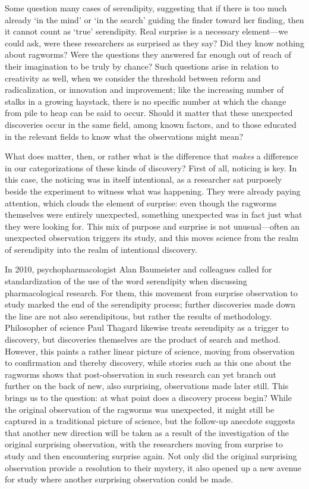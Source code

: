 \documentclass[authordate, empirical]{jote-new-article}
\begin{document}
	Some question many cases of serendipity, suggesting that if there is too much already ‘in the mind' or ‘in the search' guiding the finder toward her finding, then it cannot count as ‘true' serendipity. Real surprise is a necessary element—we could ask, were these researchers as surprised as they say? Did they know nothing about ragworms? Were the questions they answered far enough out of reach of their imagination to be truly by chance? Such questions arise in relation to creativity as well, when we consider the threshold between reform and radicalization, or innovation and improvement; like the increasing number of stalks in a growing haystack, there is no specific number at which the change from pile to heap can be said to occur. Should it matter that these unexpected discoveries occur in the same field, among known factors, and to those educated in the relevant fields to know what the observations might mean?



	What does matter, then, or rather what is the difference that \emph{makes} a difference in our categorizations of these kinds of discovery? First of all, noticing is key. In this case, the noticing was in itself intentional, as a researcher sat purposely beside the experiment to witness what was happening. They were already paying attention, which clouds the element of surprise: even though the ragworms themselves were entirely unexpected, something unexpected was in fact just what they were looking for. This mix of purpose and surprise is not unusual—often an unexpected observation triggers its study, and this moves science from the realm of serendipity into the realm of intentional discovery.



	In 2010, psychopharmacologist Alan Baumeister and colleagues called for standardization of the use of the word serendipity when discussing pharmacological research. For them, this movement from surprise observation to study marked the end of the serendipity process; further discoveries made down the line are not also serendipitous, but rather the results of methodology. Philosopher of science Paul Thagard likewise treats serendipity as a trigger to discovery, but discoveries themselves are the product of search and method. However, this paints a rather linear picture of science, moving from observation to confirmation and thereby discovery, while stories such as this one about the ragworms shows that post-observation in such research can yet branch out further on the back of new, also surprising, observations made later still. This brings us to the question: at what point does a discovery process begin? While the original observation of the ragworms was unexpected, it might still be captured in a traditional picture of science, but the follow-up anecdote suggests that another new direction will be taken as a result of the investigation of the original surprising observation, with the researchers moving from surprise to study and then encountering surprise again. Not only did the original surprising observation provide a resolution to their mystery, it also opened up a new avenue for study where another surprising observation could be made.
\end{document}
